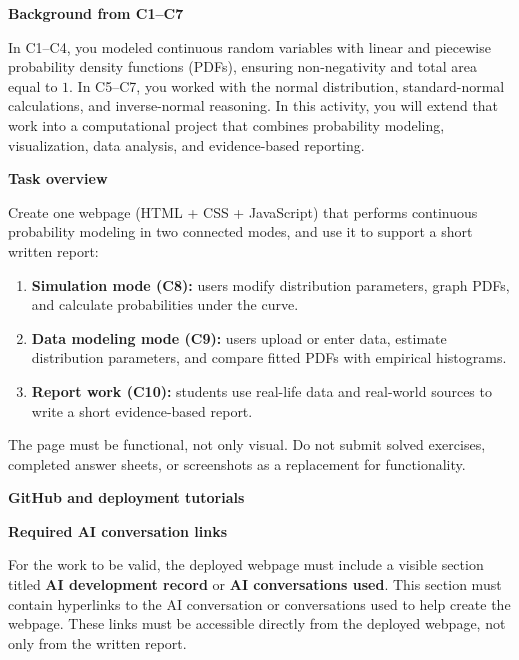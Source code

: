 \documentclass[12pt]{article}
\newcommand{\SubsectionBox}[1]{%
	\noindent\colorbox{gray!30}{%
		\parbox{\linewidth}{\textbf{#1}}%
	}\par\vspace{0.35cm}%
}
\begin{document}
	\vspace{0.25cm}
	
	\SubsectionBox{Background from C1--C7}
	In C1--C4, you modeled continuous random variables with linear and piecewise probability density functions (PDFs), ensuring non-negativity and total area equal to \(1\). In C5--C7, you worked with the normal distribution, standard-normal calculations, and inverse-normal reasoning. In this activity, you will extend that work into a computational project that combines probability modeling, visualization, data analysis, and evidence-based reporting.
	
	\SubsectionBox{Task overview}
	Create one webpage (HTML + CSS + JavaScript) that performs continuous probability modeling in two connected modes, and use it to support a short written report:
	\begin{enumerate}
		\item \textbf{Simulation mode (C8):} users modify distribution parameters, graph PDFs, and calculate probabilities under the curve.
		\item \textbf{Data modeling mode (C9):} users upload or enter data, estimate distribution parameters, and compare fitted PDFs with empirical histograms.
		\item \textbf{Report work (C10):} students use real-life data and real-world sources to write a short evidence-based report.
	\end{enumerate}
	The page must be functional, not only visual. Do not submit solved exercises, completed answer sheets, or screenshots as a replacement for functionality.
	
	\SubsectionBox{GitHub and deployment tutorials}
	\noindent{}
	
	\vspace{0.35cm}
	
	\SubsectionBox{Required AI conversation links}
	For the work to be valid, the deployed webpage must include a visible section titled \textbf{AI development record} or \textbf{AI conversations used}. This section must contain hyperlinks to the AI conversation or conversations used to help create the webpage. These links must be accessible directly from the deployed webpage, not only from the written report.
	
\end{document}
